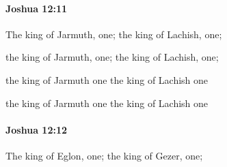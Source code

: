 		\paragraph{Joshua 12:11} %
			\label{JOSHUA-12-11}

			The king of Jarmuth, one; the king of Lachish, one;

			\begin{versebox}
					\item[BHS] 
					\item[ASV] the king of Jarmuth, one; the king of Lachish, one;
					\item[NIV] the king of Jarmuth one the king of Lachish one
					\item[NRSV] the king of Jarmuth one the king of Lachish one
			\end{versebox}

		\paragraph{Joshua 12:12} %
			\label{JOSHUA-12-12}

			The king of Eglon, one; the king of Gezer, one;

